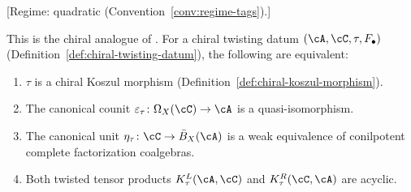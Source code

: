 \begin{theorem}
\label{thm:fundamental-twisting-morphisms}
\textup{[Regime: quadratic
\textup{(}Convention~\textup{\ref{conv:regime-tags})}.]}

\smallskip\noindent
This is the chiral analogue of \cite[Theorem~2.3.1]{LV12}.
For a chiral twisting datum
$(\cA, \cC, \tau, F_\bullet)$
\textup{(}Definition~\textup{\ref{def:chiral-twisting-datum})},
the following are equivalent:
\begin{enumerate}[label=\textup{(\roman*)}]
\item\label{ftm:koszul}
  $\tau$ is a chiral Koszul morphism
  \textup{(}Definition~\textup{\ref{def:chiral-koszul-morphism})}.
\item\label{ftm:counit}
  The canonical counit
  $\varepsilon_\tau\colon \Omega_X(\cC) \to \cA$
  is a quasi-isomorphism.
\item\label{ftm:unit}
  The canonical unit
  $\eta_\tau\colon \cC \to \bar{B}_X(\cA)$
  is a weak equivalence of conilpotent complete factorization
  coalgebras.
\item\label{ftm:acyclic}
  Both twisted tensor products $K_\tau^L(\cA,\cC)$ and
  $K_\tau^R(\cC,\cA)$ are acyclic.
\end{enumerate}
\end{theorem}

